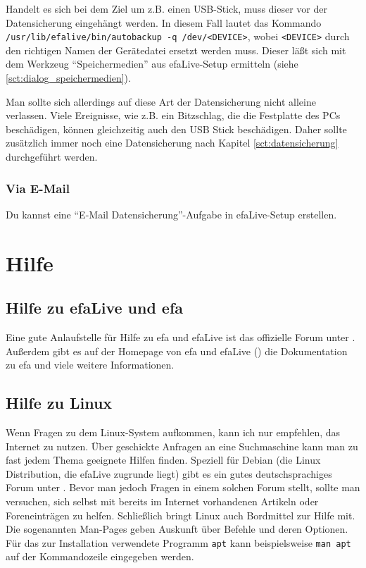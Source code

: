 \documentclass[a4paper,12pt,twoside]{article}
\begin{document}
Handelt es sich bei dem Ziel um z.B. einen USB-Stick, muss dieser vor
der Datensicherung eingehängt werden. In diesem Fall lautet das Kommando \\
\texttt{/usr/lib/efalive/bin/autobackup -q /dev/{\textless}DEVICE{\textgreater}}, wobei 
\texttt{{\textless}DEVICE{\textgreater}} durch den richtigen Namen der Gerätedatei ersetzt werden 
muss. Dieser läßt sich mit dem Werkzeug "`Speichermedien"' aus efaLive-Setup ermitteln 
(siehe \ref{sct:dialog_speichermedien}).

Man sollte sich allerdings auf diese Art der Datensicherung nicht
alleine verlassen. Viele Ereignisse, wie z.B. ein Bitzschlag, die die
Festplatte des PCs beschädigen, können gleichzeitig auch den USB Stick
beschädigen. Daher sollte zusätzlich immer noch eine Datensicherung
nach Kapitel \ref{sct:datensicherung} durchgeführt werden.


\subsubsection{Via E-Mail}
\label{cont_mail}
Du kannst eine "`E-Mail Datensicherung"'-Aufgabe in efaLive-Setup erstellen.


\section{Hilfe}
\label{sct:hilfe}
\subsection{Hilfe zu efaLive und efa}
\label{sct:hilfe_efa}
Eine gute Anlaufstelle für Hilfe zu efa und efaLive ist das offizielle
Forum unter \cite{EFA3}. Außerdem gibt es auf der Homepage von efa und
efaLive (\cite{EFA1}\cite{EFA4}\cite{EFA5}) die Dokumentation zu efa
und viele weitere Informationen.


\subsection{Hilfe zu Linux}
\label{sct:hilfe_linux}
Wenn Fragen zu dem Linux-System aufkommen, kann ich nur empfehlen, das
Internet zu nutzen. Über geschickte Anfragen an eine Suchmaschine kann
man zu fast jedem Thema geeignete Hilfen finden. Speziell für Debian
(die Linux Distribution, die efaLive zugrunde liegt) gibt es ein gutes
deutschsprachiges Forum unter \cite{HLP1}. Bevor man jedoch Fragen in
einem solchen Forum stellt, sollte man versuchen, sich selbst mit
bereits im Internet vorhandenen Artikeln oder Foreneinträgen zu helfen.
Schließlich bringt Linux auch Bordmittel zur Hilfe mit. Die sogenannten
Man-Pages geben Auskunft über Befehle und deren Optionen. Für das zur
Installation verwendete Programm \texttt{apt}
kann beispielsweise \texttt{man apt} auf der
Kommandozeile eingegeben werden.
\end{document}
